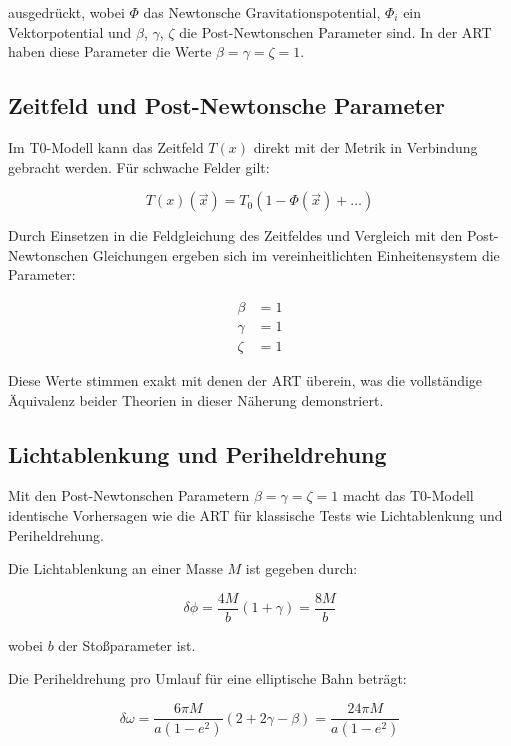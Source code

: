 \documentclass[12pt,a4paper]{article}
\newcommand{\Tfield}{T(x)}
\newcommand{\Tzero}{T_0}
\newcommand{\vecx}{\vec{x}}
\begin{document}
	ausgedrückt, wobei \(\Phi\) das Newtonsche Gravitationspotential, \(\Phi_i\) ein Vektorpotential und \(\beta\), \(\gamma\), \(\zeta\) die Post-Newtonschen Parameter sind. In der ART haben diese Parameter die Werte \(\beta = \gamma = \zeta = 1\).
	
	\subsection{Zeitfeld und Post-Newtonsche Parameter}
	
	Im T0-Modell kann das Zeitfeld \(\Tfield\) direkt mit der Metrik in Verbindung gebracht werden. Für schwache Felder gilt:
	
	\begin{equation}
		\Tfield(\vecx) = \Tzero(1 - \Phi(\vecx) + \dots)
	\end{equation}
	
	Durch Einsetzen in die Feldgleichung des Zeitfeldes und Vergleich mit den Post-Newtonschen Gleichungen ergeben sich im vereinheitlichten Einheitensystem die Parameter:
	
	\begin{align}
		\beta &= 1 \\
		\gamma &= 1 \\
		\zeta &= 1
	\end{align}
	
	Diese Werte stimmen exakt mit denen der ART überein, was die vollständige Äquivalenz beider Theorien in dieser Näherung demonstriert.
	
	\subsection{Lichtablenkung und Periheldrehung}
	
	Mit den Post-Newtonschen Parametern \(\beta = \gamma = \zeta = 1\) macht das T0-Modell identische Vorhersagen wie die ART für klassische Tests wie Lichtablenkung und Periheldrehung.
	
	Die Lichtablenkung an einer Masse \(M\) ist gegeben durch:
	
	\begin{equation}
		\delta\phi = \frac{4M}{b}(1 + \gamma) = \frac{8M}{b}
	\end{equation}
	
	wobei \(b\) der Stoßparameter ist.
	
	Die Periheldrehung pro Umlauf für eine elliptische Bahn beträgt:
	
	\begin{equation}
		\delta\omega = \frac{6\pi M}{a(1-e^2)}(2 + 2\gamma - \beta) = \frac{24\pi M}{a(1-e^2)}
	\end{equation}
	
\end{document}
